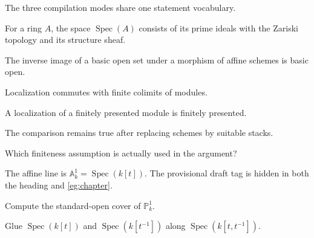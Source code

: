 \documentclass[sectionlevel=chapter,status=draft]{noteformyself}
\begin{document}
\begin{mainthm}[
  title={Chapter comparison},
  label=\labelNFM{mainthm:chapter}
]
  The three compilation modes share one statement vocabulary.
\end{mainthm}

\begin{definition}[
  title={Affine spectrum},
  label=\labelNFM{def:chapter}
]
  For a ring \(A\), the space \(\operatorname{Spec}(A)\) consists of its prime
  ideals with the Zariski topology and its structure sheaf.
\end{definition}

\begin{proposition}[label=\labelNFM{prop:chapter}]
  The inverse image of a basic open set under a morphism of affine schemes is
  basic open.
\end{proposition}

\begin{lemma}[
  title={Localization test},
  label=\labelNFM{lem:chapter}
]
  Localization commutes with finite colimits of modules.
\end{lemma}

\begin{corollary}[label=\labelNFM{cor:chapter}]
  A localization of a finitely presented module is finitely presented.
\end{corollary}

\begin{conjecture}[label=\labelNFM{conj:chapter}]
  The comparison remains true after replacing schemes by suitable stacks.
\end{conjecture}

\begin{question}[
  title={Minimal hypotheses},
  label=\labelNFM{ques:chapter}
]
  Which finiteness assumption is actually used in the argument?
\end{question}

\begin{example}[tag=0CH0202,label=\labelNFM{eg:chapter}]
  The affine line is \(\mathbb{A}^1_k=\operatorname{Spec}(k[t])\). The provisional
  draft tag is hidden in both the heading and \cref{eg:chapter}.
\end{example}

\begin{exercise}[label=\labelNFM{ex:chapter}]
  Compute the standard-open cover of \(\mathbb{P}^1_k\).
\end{exercise}

\begin{construction}[
  title={Gluing two affine lines},
  label=\labelNFM{constr:chapter}
]
  Glue \(\operatorname{Spec}(k[t])\) and \(\operatorname{Spec}(k[t^{-1}])\)
  along \(\operatorname{Spec}(k[t,t^{-1}])\).
\end{construction}
\end{document}
